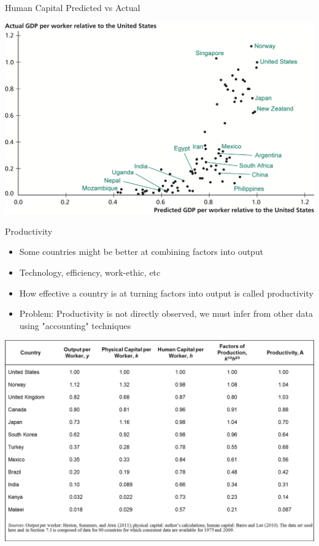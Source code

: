 \documentclass[10pt]{beamer}
\begin{document}
\begin{frame}[label={sec:org19f2a0b}]{Human Capital Predicted vs Actual}
\begin{center}
\includegraphics[width=.75\textwidth]{./img/6.12.png}
\end{center}
\end{frame}

\begin{frame}[label={sec:orgea028f4}]{}
\alert{Productivity}
\begin{itemize}
\item Some countries might be better at combining factors into output
\item Technology, efficiency, work-ethic, etc
\item How effective a country is at turning factors into output is called \alert{productivity}
\item Problem: Productivity is not directly observed, we must infer from other data using "accounting" techniques
\end{itemize}
\end{frame}

\begin{frame}[label={sec:org80a98ec}]{}
\begin{center}
\includegraphics[width=.75\textwidth]{./img/tab7.2.png}
\end{center}
\end{frame}
\end{document}
